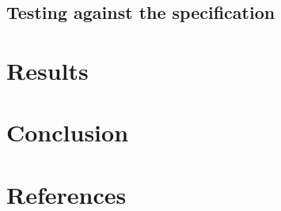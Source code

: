 \documentclass[a4paper, 12pt]{article}
\begin{document}
\subsection{Testing against the specification}



\newpage
\section{Results}



\newpage
\section{Conclusion}



\newpage
\section{References}
\end{document}
